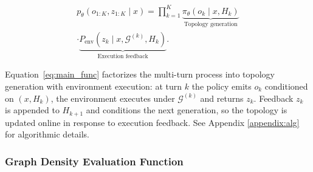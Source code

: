 \documentclass{article}
\theoremstyle{definition}
\begin{document}
\begin{multline}\label{eq:main_func}
p_\theta(o_{1:K},z_{1:K}\mid x)
=\prod_{k=1}^{K}
\underbrace{\pi_\theta\!\left(o_k \mid x,H_k\right)}_{\text{Topology generation}}
\\ \cdot
\underbrace{P_{\text{env}}\!\left(z_k \mid x,\mathcal{G}^{(k)},H_k\right)}_{\text{Execution feedback}} .
\end{multline}

Equation~\ref{eq:main_func} factorizes the multi-turn process into topology generation with environment execution: at turn $k$ the policy emits $o_k$ conditioned on $(x,H_k)$, the environment executes under $\mathcal{G}^{(k)}$ and returns $z_k$. Feedback $z_k$ is appended to $H_{k+1}$ and conditions the next generation, so the topology is updated online in response to execution feedback. See Appendix \ref{appendix:alg} for algorithmic details.
\subsubsection{ Graph Density Evaluation Function}
\label{graph:g_c}
\end{document}
